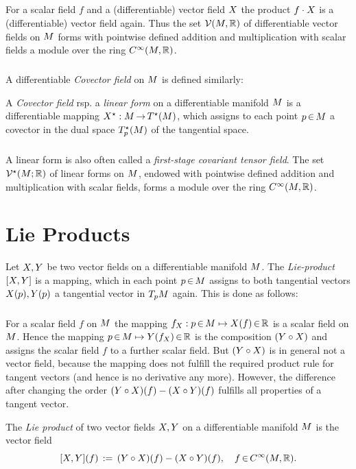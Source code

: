 \documentclass[11pt,twoside]{article}
\begin{document}
\subparagraph{}
For a scalar field $f$ and a (differentiable) vector field $X$
the product $f \cdot X$ is a (differentiable) vector field again.
Thus the set ${\mathcal{V}}({M},{\mathbb{R}})$ of differentiable vector fields on ${M}$
forms with pointwise defined addition and multiplication
with scalar fields a module over the ring $C^{\infty}({M},{\mathbb{R}})$.

\subparagraph{}
A differentiable \textit{Covector field} on ${M}$ is defined similarly:

\begin{definition}
A \textit{Covector field} rsp. a \textit{linear form} on a
differentiable manifold ${M}$ is a differentiable mapping
$X^\star:{M} {\,\to\,} T^\star({M})$,
which assigns to each point $p {\,\in\,} {M}$ a covector
in the dual space $T_p^{\star}({M})$ of the tangential space.
\end{definition}

\subparagraph{}
A linear form is also often called a \textit{first-stage covariant tensor field}.
The set ${\mathcal{V}}^\star({M};{\mathbb{R}})$ of linear forms on ${M}$,
endowed with pointwise defined addition and multiplication with scalar fields,
forms a module over the ring $C^{\infty}({M},{\mathbb{R}})$.

\section{Lie Products}
Let $X,Y$ be two vector fields on a differentiable
manifold ${M}$.
The \textit{Lie-product} $[X,Y]$ is a mapping,
which in each point $p {\,\in\,} {M}$ assigns to both tangential vectors
$X(p),Y(p)$ a tangential vector in $T_p {M}$ again.
This is done as follows:

\subparagraph{}
For a scalar field $f$ on ${M}$
the mapping
$f_X: p {\,\in\,} {M} \mapsto X(f) {\,\in\,} {\mathbb{R}}$
is a scalar field on ${M}$.
Hence the mapping $p {\,\in\,} {M} \mapsto Y(f_X) {\,\in\,} {\mathbb{R}}$ is
the composition $(Y \circ X)$
and assigns the scalar field $f$ to a further scalar field.
But $(Y \circ X)$ is in general not a vector field,
because the mapping does not fulfill the required product rule
for tangent vectors (and hence is no derivative any more).
However,
the difference after changing the order
$(Y \circ X)(f) - (X \circ Y)(f)$
fulfills all properties of a tangent vector.

\begin{definition}
The \textit{Lie product} of two vector fields $X,Y$
on a differentiable manifold ${M}$ is the vector field
\[
[X,Y](f) \,:=\, (Y \circ X)(f) - (X \circ Y)(f),
\quad f {\,\in\,} C^{\infty}({M},{\mathbb{R}}).
\]
\end{definition}
\end{document}
